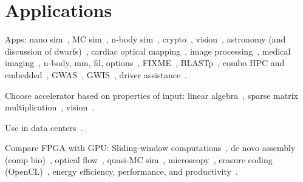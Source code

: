 \section{Applications}
\label{sec:apps}

Apps:
nano sim~\cite{khdo06},
MC sim~\cite{shsc08,tttl10},
n-body sim~\cite{tl10},
crypto~\cite{dfg+13,kl10},
vision~\cite{bkdb10,brf14},
astronomy (and discussion of dwarfs)~\cite{ibs12},
cardiac optical mapping~\cite{mjk12},
image processing~\cite{dbd+13},
medical imaging~\cite{sll13},
n-body, mm, fd, options~\cite{whk+13},
FIXME~\cite{admb14},
BLASTp~\cite{Papad14},
combo HPC and embedded~\cite{rpm+15},
GWAS~\cite{kws+16},
GWIS~\cite{wkhe17},
driver assistance~\cite{wlhk17}.

Choose accelerator based on properties of input:
linear algebra~\cite{sll+13},
sparse matrix multiplication~\cite{gsbh16},
vision~\cite{mfo+16}.

Use in data centers~\cite{fds+17}.

Compare FPGA with GPU: Sliding-window computations~\cite{cfbs15},
de novo assembly (comp bio)~\cite{mjk+16},
optical flow~\cite{bnw+10}, quasi-MC sim~\cite{tb10},
microscopy~\cite{tzwz15}, erasure coding (OpenCL)~\cite{czs+16},
energy efficiency, performance, and productivity~\cite{cdde13}.
